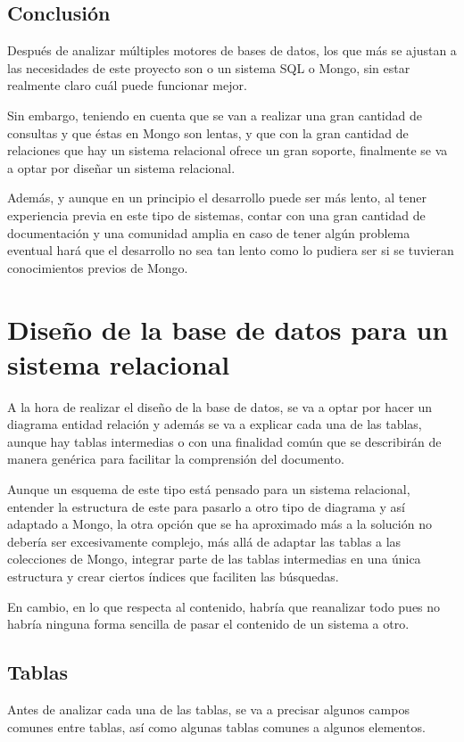 \subsection{Conclusión}
Después de analizar múltiples motores de bases de datos, los que más se ajustan a las necesidades de este proyecto son o un sistema SQL o Mongo, sin estar realmente claro cuál puede funcionar mejor. 

Sin embargo, teniendo en cuenta que se van a realizar una gran cantidad de consultas y que éstas en Mongo son lentas, y que con la gran cantidad de relaciones que hay un sistema relacional ofrece un gran soporte, finalmente se va a optar por diseñar un sistema relacional.

Además, y aunque en un principio el desarrollo puede ser más lento, al tener experiencia previa en este tipo de sistemas, contar con una gran cantidad de documentación y una comunidad amplia en caso de tener algún problema eventual hará que el desarrollo no sea tan lento como lo pudiera ser si se tuvieran conocimientos previos de Mongo. 


\section{Diseño de la base de datos para un sistema relacional}
A la hora de realizar el diseño de la base de datos, se va a optar por hacer un diagrama entidad relación y además se va a explicar cada una de las tablas, aunque hay tablas intermedias o con una finalidad común que se describirán de manera genérica para facilitar la comprensión del documento. 

Aunque un esquema de este tipo está pensado para un sistema relacional, entender la estructura de este para pasarlo a otro tipo de diagrama y así adaptado a Mongo, la otra opción que se ha aproximado más a la solución no debería ser excesivamente complejo, más allá de adaptar las tablas a las colecciones de Mongo, integrar parte de las tablas intermedias en una única estructura y crear ciertos índices que faciliten las búsquedas.

En cambio, en lo que respecta al contenido, habría que reanalizar todo pues no habría ninguna forma sencilla de pasar el contenido de un sistema a otro. 

\subsection{Tablas}
Antes de analizar cada una de las tablas, se va a precisar algunos campos comunes entre tablas, así como algunas tablas comunes a algunos elementos. 
